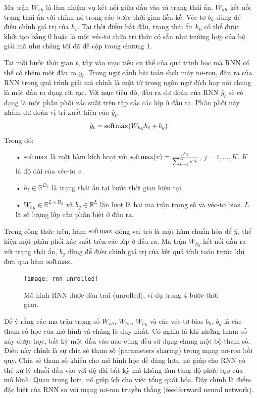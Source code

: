 Ma trận $W_{xh}$ là làm nhiệm vụ kết nối giữa đầu vào và trạng thái ẩn, $W_{hh}$ kết nối trạng thái ẩn với chính nó trong các bước thời gian liền kề. Véc-tơ $b_h$ dùng để điều chỉnh giá trị của $h_t$. Tại thời điểm bắt đầu, trạng thái ẩn $h_0$ có thể được khởi tạo bằng 0 hoặc là một véc-tơ chứa tri thức có sẵn như trường hợp của bộ giải mã như chúng tôi đã đề cập trong chương 1.

Tại mỗi bước thời gian $t$, tùy vào mục tiêu cụ thể của quá trình học mà RNN có thể có thêm một đầu ra $y_t$. Trong ngữ cảnh bài toán dịch máy nơ-ron, đầu ra của RNN trong quá trình giải mã chính là một từ trong ngôn ngữ đích hay nói chung là một đầu ra dạng rời rạc. Với mục tiêu đó, đầu ra dự đoán của RNN $\hat{y}_t$ sẽ có dạng là một phần phối xác suất trên tập các các lớp ở đầu ra. Phân phối này nhằm dự đoán vị trí xuất hiện của $\hat{y}_t$.
\begin{equation} \label{rnnOuputSoftmaxDistribution}
	\hat{y}_t = \mathrm{softmax}(W_{hy}h_t + b_y)
\end{equation}
Trong đó:
\begin{itemize}
	\item[•] $\mathrm{softmax}$ là một hàm kích hoạt với $\mathrm{softmax}(v) = \frac{e^{v_j}}{\sum_{k=1}^{K}e^{v_k}}$, $j = 1,...,K$. $K$ là độ dài của véc-tơ $v$.
	\item[•] $h_{t} \in \mathbb{R}^{D_h}$ là trạng thái ẩn tại bước thời gian hiện tại.
	\item[•] $W_{hy} \in \mathbb{R}^{L \times D_h}$ và $b_y \in \mathbb{R}^L$ lần lượt là hai ma trận trọng số và véc-tơ bias. $L$ là số lượng lớp cần phân biệt ở đầu ra.
\end{itemize}

Trong công thức trên, hàm $\mathrm{softmax}$ đóng vai trò là một hàm chuẩn hóa để $\hat{y}_t$ thể hiện một phân phối xác suất trên các lớp ở đầu ra. Ma trận $W_{hy}$ kết nối đầu ra với trạng thái ẩn, $b_y$ dùng để điều chỉnh giá trị của kết quả tính toán trước khi đưa qua hàm $\mathrm{softmax}$.

\begin{figure}
	\centering
	\texttt{[image: rnn\_unrolled]}
	\caption[Mô hình RNN dạng dàn trải]{Mô hình RNN được dàn trải (unrolled), ví dụ trong 4 bước thời gian.}
	\label{fig_rnn_unrolled}
\end{figure}

Để ý rằng các ma trận trọng số $W_{xh}$, $W_{hh}$, $W_{hy}$ và các véc-tơ bias $b_h$, $b_y$ là các tham số học của mô hình và chúng là duy nhất. Có nghĩa là khi những tham số này được học, bất kỳ một đầu vào nào cũng đều sử dụng chung một bộ tham số. Điều này chính là sự chia sẻ tham số (parameters sharing) trong mạng nơ-ron hồi quy. Chia sẻ tham số khiến cho mô hình học dễ dàng hơn, nó giúp cho RNN có thể xử lý chuỗi đầu vào với độ dài bất kỳ mà không làm tăng độ phức tạp của mô hình. Quan trọng hơn, nó giúp ích cho việc tổng quát hóa. Đây chính là điểm đặc biệt của RNN so với mạng nơ-ron truyền thẳng (feedforward neural network).

